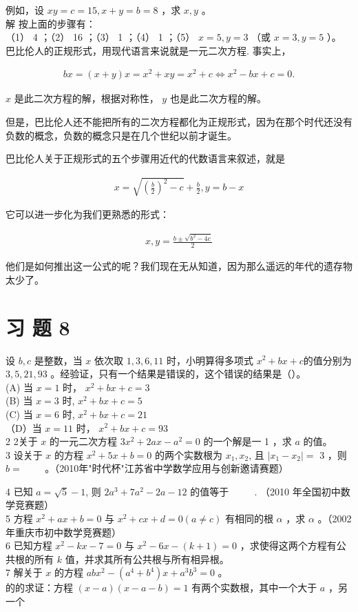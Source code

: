 \documentclass[10pt]{article}
\begin{document}
例如，设 $x y=c=15, x+y=b=8$ ，求 $x, y$ 。\\
解 按上面的步骤有：\\
（1） 4 ；（2） 16 ；（3） 1 ；（4） 1 ；（5） $x=5, y=3$ （或 $x=3, y=5$ ）。\\
巴比伦人的正规形式，用现代语言来说就是一元二次方程. 事实上，

\begin{align*}
b x=(x+y) x=x^{2}+x y=x^{2}+c \Leftrightarrow x^{2}-b x+c=0 .
\end{align*}

$x$ 是此二次方程的解，根据对称性， $y$ 也是此二次方程的解。

但是，巴比伦人还不能把所有的二次方程都化为正规形式，因为在那个时代还没有负数的概念，负数的概念只是在几个世纪以前才诞生。

巴比伦人关于正规形式的五个步骤用近代的代数语言来叙述，就是

\begin{align*}
x=\sqrt{\left(\frac{b}{2}\right)^{2}-c}+\frac{b}{2}, y=b-x
\end{align*}

它可以进一步化为我们更熟悉的形式：

\begin{align*}
x, y=\frac{b \pm \sqrt{b^{2}-4 c}}{2}
\end{align*}

他们是如何推出这一公式的呢？我们现在无从知道，因为那么遥远的年代的遗存物太少了。

\section*{习 题 8}
设 $b, c$ 是整数，当 $x$ 依次取 $1,3,6,11$ 时，小明算得多项式 $x^{2}+b x+c$的值分别为 $3,5,21,93$ 。经验证，只有一个结果是错误的，这个错误的结果是（）。\\
(A) 当 $x=1$ 时， $x^{2}+b x+c=3$\\
(B) 当 $x=3$ 时, $x^{2}+b x+c=5$\\
(C) 当 $x=6$ 时, $x^{2}+b x+c=21$\\
（D）当 $x=11$ 时， $x^{2}+b x+c=93$\\
2 2关于 $x$ 的一元二次方程 $3 x^{2}+2 a x-a^{2}=0$ 的一个解是一 1 ，求 $a$ 的值。\\
3 设关于 $x$ 的方程 $x^{2}+5 x+b=0$ 的两个实数根为 $x_{1}, x_{2}$, 且 $\left|x_{1}-x_{2}\right|=$ 3 ，则 $b=$ $\qquad$。（2010年"时代杯"江苏省中学数学应用与创新邀请赛题）

4 已知 $a=\sqrt{5}-1$, 则 $2 a^{3}+7 a^{2}-2 a-12$ 的值等于 $\qquad$ . （2010 年全国初中数学竞赛题）\\
5 方程 $x^{2}+a x+b=0$ 与 $x^{2}+c x+d=0(a \neq c)$ 有相同的根 $\alpha$ ，求 $\alpha$ 。（2002年重庆市初中数学竞赛题）\\
6 已知方程 $x^{2}-k x-7=0$ 与 $x^{2}-6 x-(k+1)=0$ ，求使得这两个方程有公共根的所有 $k$ 值，并求其所有公共根与所有相异根。\\
7 解关于 $x$ 的方程 $a b x^{2}-\left(a^{4}+b^{4}\right) x+a^{3} b^{3}=0$ 。\\
的的求证：方程 $(x-a)(x-a-b)=1$ 有两个实数根，其中一个大于 $a$ ，另一个
\end{document}
